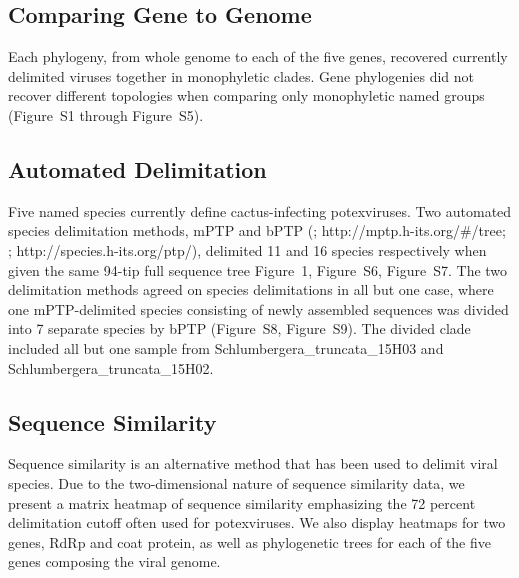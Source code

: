 \documentclass[fleqn,10pt,lineno]{wlpeerj}
\begin{document}
{\subsection*{Comparing Gene to Genome}
Each phylogeny, from whole genome to each of the five genes, recovered currently delimited viruses together in monophyletic clades. 
Gene phylogenies did not recover different topologies when comparing only monophyletic named groups ({Figure~S1 through Figure~S5}). %

\subsection*{Automated Delimitation}
Five named species currently define cactus-infecting potexviruses. 
Two automated species delimitation methods, mPTP and bPTP (\citealt{Kapli_2017}; http://mptp.h-its.org/\#/tree; \citealt{Zhang_2013}; http://species.h-its.org/ptp/), delimited 11 and 16 species respectively when given the same 94-tip full sequence tree {Figure~1, Figure~S6, Figure~S7}. 
The two delimitation methods agreed on species delimitations in all but one case, where one mPTP-delimited species consisting of newly assembled sequences was divided into 7 separate species by bPTP ({Figure~S8, Figure~S9}).
The divided clade included all but one sample from Schlumbergera\_truncata\_15H03 and Schlumbergera\_truncata\_15H02.

\subsection*{Sequence Similarity}
Sequence similarity is an alternative method that has been used to delimit viral species.
Due to the two-dimensional nature of sequence similarity data, we present a matrix heatmap of sequence similarity emphasizing the 72 percent delimitation cutoff often used for potexviruses. %
We also display heatmaps for two genes, RdRp and coat protein, as well as phylogenetic trees for each of the five genes composing the viral genome. 




}
\end{document}
